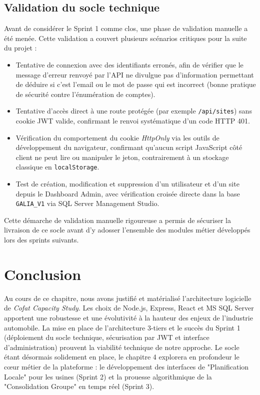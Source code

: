 \subsection{Validation du socle technique}
Avant de considérer le Sprint 1 comme clos, une phase de validation manuelle a été menée. Cette validation a couvert plusieurs scénarios critiques pour la suite du projet :
\begin{itemize}
    \item Tentative de connexion avec des identifiants erronés, afin de vérifier que le message d'erreur renvoyé par l'API ne divulgue pas d'information permettant de déduire si c'est l'email ou le mot de passe qui est incorrect (bonne pratique de sécurité contre l'énumération de comptes).
    \item Tentative d'accès direct à une route protégée (par exemple \texttt{/api/sites}) sans cookie JWT valide, confirmant le renvoi systématique d'un code HTTP 401.
    \item Vérification du comportement du cookie \textit{HttpOnly} via les outils de développement du navigateur, confirmant qu'aucun script JavaScript côté client ne peut lire ou manipuler le jeton, contrairement à un stockage classique en \texttt{localStorage}.
    \item Test de création, modification et suppression d'un utilisateur et d'un site depuis le Dashboard Admin, avec vérification croisée directe dans la base \texttt{GALIA\_V1} via SQL Server Management Studio.
\end{itemize}
Cette démarche de validation manuelle rigoureuse a permis de sécuriser la livraison de ce socle avant d'y adosser l'ensemble des modules métier développés lors des sprints suivants.

\section{Conclusion}
Au cours de ce chapitre, nous avons justifié et matérialisé l'architecture logicielle de \textit{Cofat Capacity Study}. Les choix de Node.js, Express, React et MS SQL Server apportent une robustesse et une évolutivité à la hauteur des enjeux de l'industrie automobile. La mise en place de l'architecture 3-tiers et le succès du Sprint 1 (déploiement du socle technique, sécurisation par JWT et interface d'administration) prouvent la viabilité technique de notre approche. 
Le socle étant désormais solidement en place, le chapitre 4 explorera en profondeur le cœur métier de la plateforme : le développement des interfaces de "Planification Locale" pour les usines (Sprint 2) et la prouesse algorithmique de la "Consolidation Groupe" en temps réel (Sprint 3).